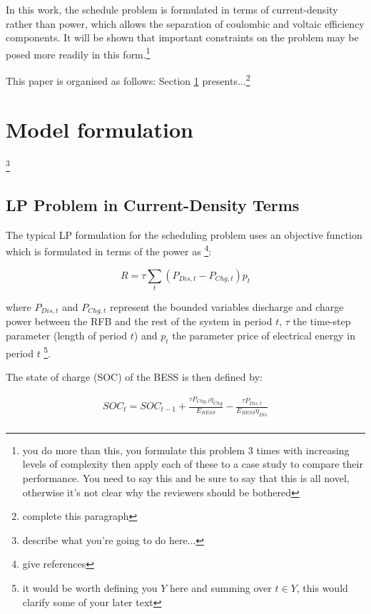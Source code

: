 \documentclass[preprint,3p,review,authoryear,10pt]{elsarticle}
\newcommand{\sol}[1]{\footnote{#1}\marginpar{\fbox{\thefootnote}}}
\begin{document}
In this work, the schedule problem is formulated in terms of current-density rather than power, which allows the separation of coulombic and voltaic efficiency components. It will be shown that important constraints on the problem may be posed more readily in this form.\sol{you do more than this, you formulate this problem 3 times with increasing levels of complexity then apply each of these to a case study to compare their performance. You need to say this and be sure to say that this is all novel, otherwise it's not clear why the reviewers should be bothered}

This paper is organised as follows: Section \ref{sec:Model_Formulation} presents...\sol{complete this paragraph}

\section{Model formulation}
\label{sec:Model_Formulation}
\sol{describe what you're going to do here...}
\subsection{LP Problem in Current-Density Terms}
\label{Model_Formulation_LP_Reference_Current_Density_Terms}
The typical LP formulation for the scheduling problem uses an objective function which is formulated in terms of the power as \sol{give references}:

\begin{equation}
\label{eqn:Lit_Review_LP_Obj_Func}
R = \tau \sum_{t} (P_{Dis,t} - P_{Chg,t}) p_t
\end{equation}

where $P_{Dis,t}$ and $P_{Chg,t}$ represent the bounded variables discharge and charge power between the RFB and the rest of the system in period $t$, $\tau$ the time-step parameter (length of period $t$) and $p_t$ the parameter price of electrical energy in period $t$ \sol{it would be worth defining you $Y$ here and summing over $t \in Y$, this would clarify some of your later text}.

The state of charge (SOC) of the BESS is then defined by:

\begin{equation}
\label{eqn: Lit_Review_LP_SOC_Constraint_Example}
\begin{gathered}
SOC_t = SOC_{t-1} + \frac{\tau P_{Chg,t} \eta_{Chg}}{E_{BESS}} - \frac{\tau P_{Dis,t}}{E_{BESS}\eta_{Dis}} \\
\end{gathered}
\end{equation}
\end{document}
